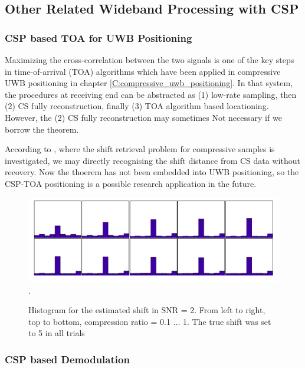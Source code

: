\subsection{Other Related Wideband Processing with CSP}

\subsubsection{CSP based TOA for UWB Positioning}\label{sct:csp_toa}

Maximizing the cross-correlation between the two signals is one of the key steps in time-of-arrival (TOA) algorithms which have been applied in compressive UWB positioning in chapter \ref{C:compressive_uwb_positioning}. In that system, the procedures at receiving end can be abstracted as (1) low-rate sampling, then (2) CS fully reconstruction, finally (3) TOA algorithm based locationing. However, the (2) CS fully reconstruction may sometimes Not necessary if we borrow the theorem.

According to \cite{ohlsson2013compressive}, where the shift retrieval problem for compressive samples is investigated, we may directly recognising the shift distance from CS data without recovery. Now the thoerem has not been embedded into UWB positioning, so the CSP-TOA positioning is a possible research application in the future.

\begin{figure}[!t]
\centering
\includegraphics[width=0.75\columnwidth]{figs/csp-shift.png}
\DeclareGraphicsExtensions.
\caption{Histogram for the estimated shift in SNR = 2. From left to right, top to bottom, compression ratio = 0.1 ... 1. The true shift was set to 5 in all trials}\label{csp-shift}
\end{figure}

\subsubsection{CSP based Demodulation}

